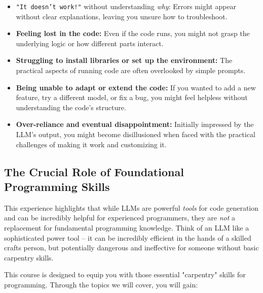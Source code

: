 \begin{itemize}
    \item \texttt{"It doesn't work!"} without understanding \textit{why}:  Errors might appear without clear explanations, leaving you unsure how to troubleshoot.
    \item \textbf{Feeling lost in the code:} Even if the code runs, you might not grasp the underlying logic or how different parts interact.
    \item \textbf{Struggling to install libraries or set up the environment:} The practical aspects of running code are often overlooked by simple prompts.
    \item \textbf{Being unable to adapt or extend the code:} If you wanted to add a new feature, try a different model, or fix a bug, you might feel helpless without understanding the code's structure.
    \item \textbf{Over-reliance and eventual disappointment:}  Initially impressed by the LLM's output, you might become disillusioned when faced with the practical challenges of making it work and customizing it.
\end{itemize}

\newpage
\subsection{The Crucial Role of Foundational Programming Skills}

This experience highlights that while LLMs are powerful \textit{tools} for code generation and can be incredibly helpful for experienced programmers, they are \textit{not} a replacement for fundamental programming knowledge.  Think of an LLM like a sophisticated power tool – it can be incredibly efficient in the hands of a skilled crafts person, but potentially dangerous and ineffective for someone without basic carpentry skills.

This course is designed to equip you with those essential "carpentry" skills for programming.  Through the topics we will cover, you will gain:

